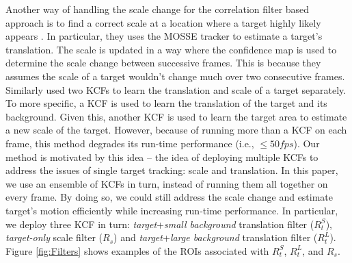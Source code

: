 \documentclass[10pt,twocolumn,letterpaper]{article}
\newcounter{ct}
\begin{document}
Another way of handling the scale change for the correlation filter
based approach is to find a correct scale at a location where a target
highly likely appears \cite{zhang2014fast}. In particular, they uses
the MOSSE tracker to estimate a target's translation. The scale is
updated in a way where the confidence map is used to determine the
scale change between successive frames. This is because they assumes
the scale of a target wouldn't change much over two consecutive
frames. Similarly \cite{ma2015long} used two KCFs to learn the
translation and scale of a target separately. To more specific, a KCF
is used to learn the translation of the target and its
background. Given this, another KCF is used to learn the target area
to estimate a new scale of the target. However, because of running
more than a KCF on each frame, this method degrades its run-time
performance (i.e., $\leq 50 fps$). Our method is motivated by this
idea -- the idea of deploying multiple KCFs to address the issues of
single target tracking: scale and translation. In this paper, we use
an ensemble of KCFs in turn, instead of running them all together on
every frame. By doing so, we could still address the scale change and
estimate target's motion efficiently while increasing run-time
performance. In particular, we deploy three KCF in turn:
\textit{target}+\textit{small background} translation filter
($R_{t}^{S}$), \textit{target-only} scale filter ($R_{s}$) and
\textit{target}+\textit{large background} translation filter
($R_{t}^{L}$). Figure \ref{fig:Filters} shows examples of the ROIs
associated with $R_{t}^{S}$, $R_{t}^{L}$, and $R_{s}$.

\end{document}
